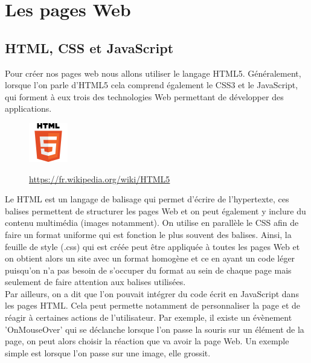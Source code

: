 \section{Les pages Web}

\subsection{HTML, CSS et JavaScript}
Pour créer nos pages web nous allons utiliser le langage HTML5. Généralement, lorsque l'on parle d'HTML5 cela comprend également le CSS3 et le JavaScript, qui forment à eux trois des technologies Web permettant de développer des applications.
\begin{figure}[H]
  \center
  \includegraphics[scale=0.6]{../graph/html5.png} \\
  \caption{ \url{https://fr.wikipedia.org/wiki/HTML5}}
\end{figure}

Le HTML est un langage de balisage qui permet d'écrire de l'hypertexte, ces balises permettent de structurer les pages Web et on peut également y inclure du contenu multimédia (images notamment). On utilise en parallèle le CSS afin de faire un format uniforme qui est fonction le plus souvent des balises. Ainsi, la feuille de style (.css) qui est créée peut être appliquée à toutes les pages Web et on obtient alors un site avec un format homogène et ce en ayant un code léger puisqu'on n'a pas besoin de s'occuper du format au sein de chaque page mais seulement de faire attention aux balises utilisées.\\

Par ailleurs, on a dit que l'on pouvait intégrer du code écrit en JavaScript dans les pages HTML. Cela peut permette notamment de personnaliser la page et de réagir à certaines actions de l'utilisateur. Par exemple, il existe un évènement 'OnMouseOver' qui se déclanche lorsque l'on passe la souris sur un élément de la page, on peut alors choisir la réaction que va avoir la page Web. Un exemple simple est lorsque l'on passe sur une image, elle grossit. \\

